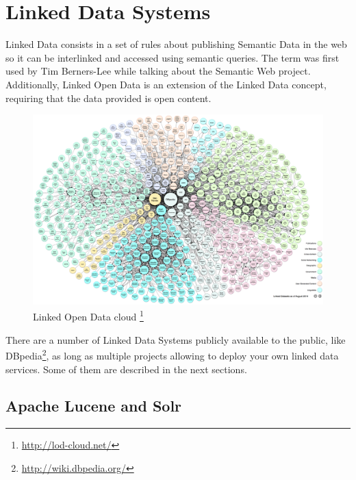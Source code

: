 
\section{Linked Data Systems}
\label{sec:linkd_sys}

Linked Data consists in a set of rules about publishing Semantic Data in the web so it can be interlinked and accessed using semantic queries. The term was first used by Tim Berners-Lee while talking about the Semantic Web project. Additionally, Linked Open Data is an extension of the Linked Data concept, requiring that the data provided is open content.

\begin{figure}[!htbp]
  \begin{minipage}{\linewidth}
    \centering
    \includegraphics[width=\textwidth]{img/enabling/lod-cloud.png}
    \caption[Linked Open Data cloud]{%
      Linked Open Data cloud%
      \footnote{\url{http://lod-cloud.net/}}%
      }
    \label{fig:lodcloud}
  \end{minipage}
\end{figure}

There are a number of Linked Data Systems publicly available to the public, like DBpedia\footnote{\url{http://wiki.dbpedia.org/}}, as long as multiple projects allowing to deploy your own linked data services. Some of them are described in the next sections. 

\subsection{Apache Lucene and Solr}
\label{sec:statesolr}

